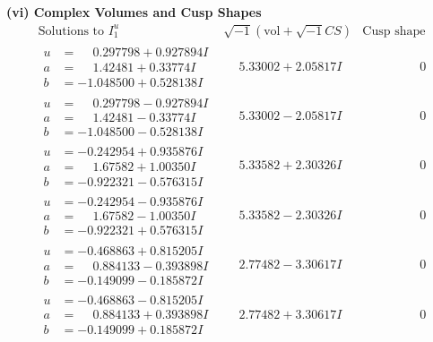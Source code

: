 \documentclass[1p]{elsarticle_modified}
\theoremstyle{definition}
\newcommand{\I}{\sqrt{-1}}
\begin{document}
\newpage\flushleft \textbf{(vi) Complex Volumes and Cusp Shapes}
$$\begin{array}{c|c|c}  
\text{Solutions to }I^u_{1}& \I (\text{vol} + \sqrt{-1}CS) & \text{Cusp shape}\\
 \hline 
\begin{aligned}
u &= \phantom{-}0.297798 + 0.927894 I \\
a &= \phantom{-}1.42481 + 0.33774 I \\
b &= -1.048500 + 0.528138 I\end{aligned}
 & \phantom{-}5.33002 + 2.05817 I & \phantom{-0.000000 } 0 \\ \hline\begin{aligned}
u &= \phantom{-}0.297798 - 0.927894 I \\
a &= \phantom{-}1.42481 - 0.33774 I \\
b &= -1.048500 - 0.528138 I\end{aligned}
 & \phantom{-}5.33002 - 2.05817 I & \phantom{-0.000000 } 0 \\ \hline\begin{aligned}
u &= -0.242954 + 0.935876 I \\
a &= \phantom{-}1.67582 + 1.00350 I \\
b &= -0.922321 - 0.576315 I\end{aligned}
 & \phantom{-}5.33582 + 2.30326 I & \phantom{-0.000000 } 0 \\ \hline\begin{aligned}
u &= -0.242954 - 0.935876 I \\
a &= \phantom{-}1.67582 - 1.00350 I \\
b &= -0.922321 + 0.576315 I\end{aligned}
 & \phantom{-}5.33582 - 2.30326 I & \phantom{-0.000000 } 0 \\ \hline\begin{aligned}
u &= -0.468863 + 0.815205 I \\
a &= \phantom{-}0.884133 - 0.393898 I \\
b &= -0.149099 - 0.185872 I\end{aligned}
 & \phantom{-}2.77482 - 3.30617 I & \phantom{-0.000000 } 0 \\ \hline\begin{aligned}
u &= -0.468863 - 0.815205 I \\
a &= \phantom{-}0.884133 + 0.393898 I \\
b &= -0.149099 + 0.185872 I\end{aligned}
 & \phantom{-}2.77482 + 3.30617 I & \phantom{-0.000000 } 0 \\ \hline\begin{aligned}

\end{aligned}
\end{array}$$
\end{document}

